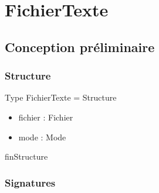 
    \section*{FichierTexte}
    \subsection*{Conception préliminaire}
    \subsubsection*{Structure}

    Type FichierTexte = Structure
	\begin{itemize}[label=$\ $, leftmargin=2cm]
		 \item fichier : Fichier
		 \item mode : Mode
	\end{itemize}
    finStructure
    
    \subsubsection*{Signatures}

